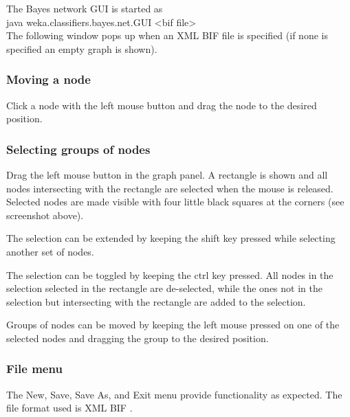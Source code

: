 The Bayes network GUI is started as\\
java weka.classifiers.bayes.net.GUI <bif file> \\
The following window pops up when an XML BIF file is specified (if none is
specified an empty graph is shown).

\begin{center}
\end{center}


\subsubsection*{Moving a node}
Click a node with the left mouse button and drag the node to the desired position.

\subsubsection*{Selecting groups of nodes}

Drag the left mouse button in the graph panel. A rectangle is shown and
all nodes intersecting with the rectangle are selected when the mouse is
released. Selected nodes are made visible with four little black squares at the 
corners (see screenshot above).

The selection can be extended by keeping the shift key pressed while selecting
another set of nodes.

The selection can be toggled by keeping the ctrl key pressed. All nodes in the
selection selected in the rectangle are de-selected, while the ones not in the
selection but intersecting with the rectangle are added to the selection.

Groups of nodes can be moved by keeping the left mouse pressed on one of the
selected nodes and dragging the group to the desired position.

\subsubsection*{File menu}

\begin{center}
\end{center}

The New, Save, Save As, and Exit menu provide functionality as expected.
The file format used is XML BIF \cite{cozman}.

